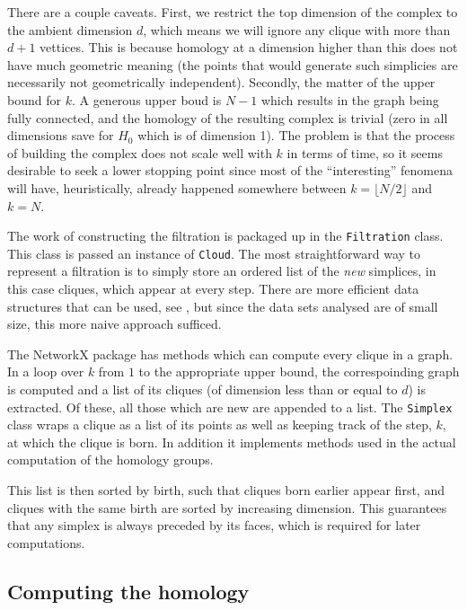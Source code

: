 \documentclass[../main.tex]{subfiles}
\begin{document}
There are a couple caveats. First, we restrict the top dimension of the complex to the
ambient dimension \( d \), which means we will ignore any clique with more than \( d+1 \)
vettices. This is because homology at a dimension higher than this does not have much
geometric meaning (the points that would generate such simplicies are necessarily not
geometrically independent). Secondly, the matter of the upper bound for \( k \). A
generous upper boud is \( N-1 \) which results in the \MKNN graph being fully connected,
and the homology of the resulting complex is trivial (zero in all dimensions save for \(
H_0 \) which is of dimension 1). The problem is that the process of building the complex
does not scale well with \( k \) in terms of time, so it seems desirable to seek a lower
stopping point since most of the ``interesting'' fenomena will have, heuristically, already
happened somewhere between \( k = \lfloor N/2 \rfloor \) and \( k = N \). 

The work of constructing the filtration is packaged up in the \texttt{Filtration} class.
This class is passed an instance of \texttt{Cloud}. The most straightforward way to
represent a filtration is to simply store an ordered list of the \emph{new} simplices, in
this case cliques, which appear at every step. There are more efficient data structures
that can be used, see \cite{efficient, tidyset}, but since the data sets analysed are of small size, this more naive approach sufficed. 

The \textsf{NetworkX} package has methods which can compute every clique in a graph. In a
loop over \( k \) from \( 1 \) to the appropriate upper bound, the correspoinding \MKNN
graph is computed and a list of its cliques (of dimension less than or equal to \( d \))
is extracted. Of these, all those which are new are appended to a list. The
\texttt{Simplex} class wraps a clique as a list of its points as well as keeping track of the
step, \( k \), at which the clique is born. In addition it implements methods used in the
actual computation of the homology groups.

This list is then sorted by birth, such that cliques born earlier appear first, and
cliques with the same birth are sorted by increasing dimension. This guarantees that any
simplex is always preceded by its faces, which is required for later computations. 


\subsection{Computing the homology}\label{sec:justification}
\end{document}
